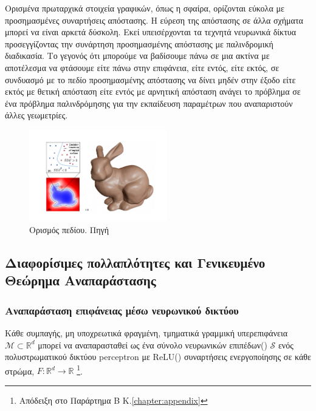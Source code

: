     
    Ορισμένα πρωταρχικά στοιχεία γραφικών, όπως η σφαίρα, ορίζονται εύκολα με προσημασμένες συναρτήσεις απόστασης. Η εύρεση της απόστασης σε άλλα σχήματα μπορεί να είναι αρκετά δύσκολη. Εκεί υπεισέρχονται τα τεχνητά νευρωνικά δίκτυα προσεγγίζοντας την συνάρτηση προσημασμένης απόστασης με παλινδρομική διαδικασία. Το γεγονός ότι μπορούμε να βαδίσουμε πάνω σε μια ακτίνα με αποτέλεσμα να φτάσουμε είτε πάνω στην επιφάνεια, είτε εντός, είτε εκτός, σε συνδυασμό με το πεδίο προσημασμένης απόστασης να δίνει μηδέν στην έξοδο είτε εκτός με θετική απόσταση είτε εντός με αρνητική απόσταση ανάγει το πρόβλημα σε ένα πρόβλημα παλινδρόμησης για την εκπαίδευση παραμέτρων που αναπαριστούν άλλες γεωμετρίες.
            
\begin{figure}[H]
    \centering
    \includegraphics[width=6cm]{images/chapter2_img/DeepSDFFields.jpg}
    \caption{Ορισμός  πεδίου. Πηγή \cite{yariv2020multiview}}
    \label{fig:DeepSDFlioryariv}
\end{figure}
\subsection{Διαφορίσιμες πολλαπλότητες και Γενικευμένο Θεώρημα Αναπαράστασης}

\subsubsection*{Αναπαράσταση  επιφάνειας μέσω νευρωνικού δικτύου}

\begin{theorem}
     Κάθε συμπαγής, μη υποχρεωτικά φραγμένη, τμηματικά γραμμική υπερεπιφάνεια $\mathcal{M} \subset \mathbb{R}^d$ μπορεί να αναπαρασταθεί ως ένα σύνολο νευρωνικών επιπέδων() $\mathcal{S}$ ενός πολυστρωματικού δικτύου perceptron με ReLU() συναρτήσεις ενεργοποίησης σε κάθε στρώμα, $F: \mathbb{R}^d \rightarrow \mathbb{R}$
     \label{theorem: Bocher's Theorem} \cite{haykin2009neural} \footnote{Απόδειξη στο Παράρτημα Β K.\ref{chapter:appendix}}.
\end{theorem} 

